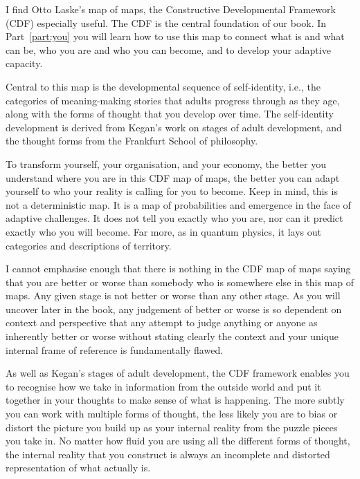 I find Otto Laske's map of maps, the Constructive Developmental Framework (CDF)\cite{laske-vol1,laske-vol2} especially useful. The CDF is the central foundation of our book. In Part~\ref{part:you} you will learn how to use this map to connect what is and what can be, who you are and who you can become, and to develop your adaptive capacity.


Central to this map is the developmental sequence of self-identity, i.e., the categories of meaning\hyp{}making stories that adults progress through as they age, along with the forms of thought that you develop over time. The self-identity development is derived from Kegan’s work on stages of adult development, and the thought forms from the Frankfurt School of philosophy.


To transform yourself, your organisation, and your economy, the better you understand where you are in this CDF map of maps, the better you can adapt yourself to who your reality is calling for you to become. Keep in mind, this is not a deterministic map. It is a map of probabilities and emergence in the face of adaptive challenges. It does not tell you exactly who you are, nor can it predict exactly who you will become. Far more, as in quantum physics, it lays out categories and descriptions of territory.


I cannot emphasise enough that there is nothing in the CDF map of maps saying that you are better or worse than somebody who is somewhere else in this map of maps. Any given stage is not better or worse than any other stage. As you will uncover later in the book, any judgement of better or worse is so dependent on context and perspective that any attempt to judge anything or anyone as inherently better or worse without stating clearly the context and your unique internal frame of reference is fundamentally flawed.


As well as Kegan's stages of adult development, the CDF framework enables you to recognise how we take in information from the outside world and put it together in your thoughts to make sense of what is happening. The more subtly you can work with multiple forms of thought, the less likely you are to bias or distort the picture you build up as your internal reality from the puzzle pieces you take in. No matter how fluid you are using all the different forms of thought, the internal reality that you construct is always an incomplete and distorted representation of what actually is.


